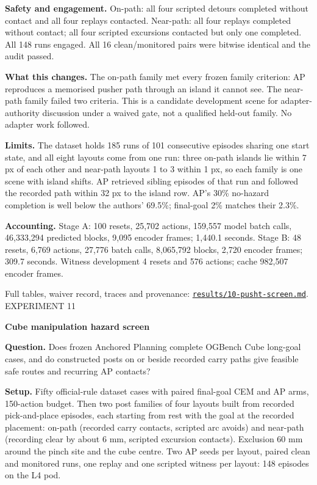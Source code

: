 \documentclass[10pt,a4paper]{article}
\begin{document}
\textbf{Safety and engagement.} On-path: all four scripted detours completed without contact and all four replays contacted. Near-path: all four replays completed without contact; all four scripted excursions contacted but only one completed. All 148 runs engaged. All 16 clean/monitored pairs were bitwise identical and the audit passed.

\textbf{What this changes.} The on-path family met every frozen family criterion: AP reproduces a memorised pusher path through an island it cannot see. The near-path family failed two criteria. This is a candidate development scene for adapter-authority discussion under a waived gate, not a qualified held-out family. No adapter work followed.

\textbf{Limits.} The dataset holds 185 runs of 101 consecutive episodes sharing one start state, and all eight layouts come from one run: three on-path islands lie within 7 px of each other and near-path layouts 1 to 3 within 1 px, so each family is one scene with island shifts. AP retrieved sibling episodes of that run and followed the recorded path within 32 px to the island row. AP's 30\% no-hazard completion is well below the authors' 69.5\%; final-goal 2\% matches their 2.3\%.

\textbf{Accounting.} Stage A: 100 resets, 25,702 actions, 159,557 model batch calls, 46,333,294 predicted blocks, 9,095 encoder frames; 1,440.1 seconds. Stage B: 48 resets, 6,769 actions, 27,776 batch calls, 8,065,792 blocks, 2,720 encoder frames; 309.7 seconds. Witness development 4 resets and 576 actions; cache 982,507 encoder frames.

{\footnotesize Full tables, waiver record, traces and provenance: \href{results/10-pusht-screen.md}{\texttt{results/10-pusht-screen.md}}.}
\newpage
{\small\textcolor{ink}{EXPERIMENT 11}}\par
{\LARGE\bfseries Cube manipulation hazard screen}\par
\textbf{Question.} Does frozen Anchored Planning complete OGBench Cube long-goal cases, and do constructed posts on or beside recorded carry paths give feasible safe routes and recurring AP contacts?

\textbf{Setup.} Fifty official-rule dataset cases with paired final-goal CEM and AP arms, 150-action budget. Then two post families of four layouts built from recorded pick-and-place episodes, each starting from rest with the goal at the recorded placement: on-path (recorded carry contacts, scripted arc avoids) and near-path (recording clear by about 6 mm, scripted excursion contacts). Exclusion 60 mm around the pinch site and the cube centre. Two AP seeds per layout, paired clean and monitored runs, one replay and one scripted witness per layout: 148 episodes on the L4 pod.
\end{document}
